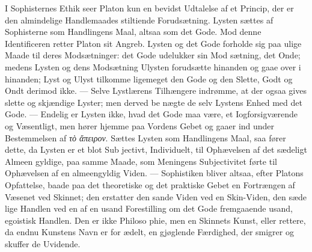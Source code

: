 \documentclass[12pt,a4paper]{book}
\newcommand{\gk}[1]{\textit{#1}}
\begin{document}
I Sophisternes Ethik seer Platon kun en bevidst Udtalelse
af et Princip, der er den almindelige Handlemaades stiltiende
Forudsætning. Lysten sættes af Sophisterne som Handlingens
Maal, altsaa som det Gode. Mod denne Identificeren retter
Platon sit Angreb. Lysten og det Gode forholde sig paa ulige
Maade til deres Modsætninger: det Gode udelukker sin Mod\-%
sætning, det Onde; medens Lysten og dens Modsætning
Ulysten forudsætte hinanden og gaae over i hinanden; Lyst
og Ulyst tilkomme ligemeget den Gode og den Slette, Godt
og Ondt derimod ikke. --- Selve Lystlærens Tilhængere indrømme,
at der ogsaa gives slette og skjændige Lyster; men derved be\-%
nægte de selv Lystens Enhed med det Gode. --- Endelig er
Lysten ikke, hvad det Gode maa være, et Iogforsigværende og
Væsentligt, men hører hjemme paa Vordens Gebet og gaaer
ind under Bestemmelsen af \gk{τὸ ἄπειρον}. Sættes Lysten som
Handlingens Maal, saa fører dette, da Lysten er et blot Sub\-%
jectivt, Individuelt, til Ophævelsen af det sædeligt Almeen\-%
gyldige, paa samme Maade, som Meningens Subjectivitet førte
til Ophævelsen af en almeengyldig Viden. --- Sophistiken bliver
altsaa, efter Platons Opfattelse, baade paa det theoretiske og
det praktiske Gebet en Fortrængen af Væsenet ved Skinnet;
den erstatter den sande Viden ved en Skin-Viden, den sæde\-%
lige Handlen ved en af en usand Forestilling om det Gode
fremgaaende usand, egoistisk Handlen. Den er ikke Philoso\-%
phie, men en Skinnets Kunst, eller rettere, da endnu Kunstens
Navn er for ædelt, en gjøglende Færdighed, der smigrer og
skuffer de Uvidende.
\end{document}

